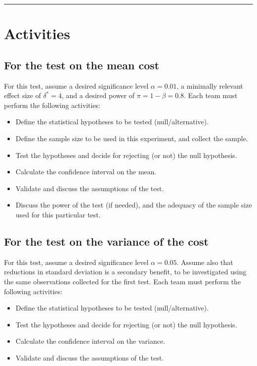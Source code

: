 \documentclass[11pt,twoside,printwatermark=false]{pinp}
\providecommand{\tightlist}{%
  \setlength{\itemsep}{0pt}\setlength{\parskip}{0pt}}
\begin{document}
\begin{center}\rule{0.5\linewidth}{\linethickness}\end{center}

\newpage

\section{Activities}\label{activities}

\subsection{For the test on the mean
cost}\label{for-the-test-on-the-mean-cost}

For this test, assume a desired significance level \(\alpha = 0.01\), a
minimally relevant effect size of \(\delta^* = 4\), and a desired power
of \(\pi = 1 - \beta = 0.8\). Each team must perform the following
activities:

\begin{itemize}
\tightlist
\item
  Define the statistical hypotheses to be tested (null/alternative).
\item
  Define the sample size to be used in this experiment, and collect the
  sample.
\item
  Test the hypotheses and decide for rejecting (or not) the null
  hypothesis.
\item
  Calculate the confidence interval on the mean.
\item
  Validate and discuss the assumptions of the test.
\item
  Discuss the power of the test (if needed), and the adequacy of the
  sample size used for this particular test.
\end{itemize}

\subsection{For the test on the variance of the
cost}\label{for-the-test-on-the-variance-of-the-cost}

For this test, assume a desired significance level \(\alpha = 0.05\).
Assume also that reductions in standard deviation is a secondary
benefit, to be investigated using the same observations collected for
the first test. Each team must perform the following activities:

\begin{itemize}
\tightlist
\item
  Define the statistical hypotheses to be tested (null/alternative).
\item
  Test the hypotheses and decide for rejecting (or not) the null
  hypothesis.
\item
  Calculate the confidence interval on the variance.
\item
  Validate and discuss the assumptions of the test.
\end{itemize}
\end{document}
